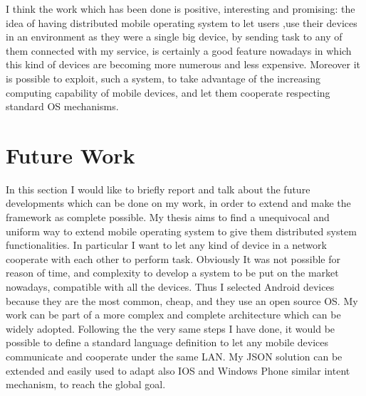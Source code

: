 I think the work which has been done is positive, interesting and promising: the
idea of having distributed mobile operating system to let users ,use their devices in an environment as they were a single big device, by sending task to any of them connected with my service, is certainly a good feature nowadays in which this kind of devices are becoming more numerous and less expensive. Moreover it is possible to exploit, such a system, to take advantage of the increasing computing capability of mobile devices, and let them cooperate respecting standard OS mechanisms.
\section{Future Work} 
In this section I would like to briefly report and talk about the future developments which can be done on my work, in order to extend and make the framework as complete possible.
My thesis aims to find a unequivocal and uniform way to extend mobile operating system to give them distributed system functionalities. In particular I want to let any kind of device in a network cooperate with each other to perform task. Obviously It was not possible for
reason of time, and complexity to develop a system to be put on the market nowadays, compatible with all the devices. Thus I selected Android devices because they are the most common, cheap, and they use an open source OS. My work can be part of a more complex and complete architecture which can be widely adopted. Following the the very same steps I have done, it would be possible to define a standard language definition to let any mobile devices communicate and cooperate under the same LAN. My JSON solution can be extended and easily used to adapt also IOS and Windows Phone similar intent mechanism, to reach the global goal.



%

